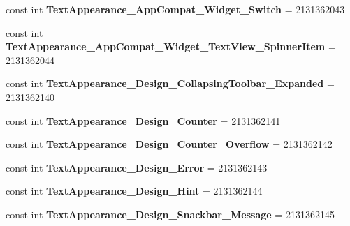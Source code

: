 \begin{DoxyCompactItemize}
const int {\bfseries Text\+Appearance\+\_\+\+App\+Compat\+\_\+\+Widget\+\_\+\+Switch} = 2131362043
\item 
\mbox{\label{class_sample_app_1_1_droid_1_1_resource_1_1_style_a3295f41aa6ce860e41ff571d0aaca1c1}} 
const int {\bfseries Text\+Appearance\+\_\+\+App\+Compat\+\_\+\+Widget\+\_\+\+Text\+View\+\_\+\+Spinner\+Item} = 2131362044
\item 
\mbox{\label{class_sample_app_1_1_droid_1_1_resource_1_1_style_ad457bffa7a45bf7fe483b547f41b3db3}} 
const int {\bfseries Text\+Appearance\+\_\+\+Design\+\_\+\+Collapsing\+Toolbar\+\_\+\+Expanded} = 2131362140
\item 
\mbox{\label{class_sample_app_1_1_droid_1_1_resource_1_1_style_a3cb410788e5c430deda63b88c0b3ae76}} 
const int {\bfseries Text\+Appearance\+\_\+\+Design\+\_\+\+Counter} = 2131362141
\item 
\mbox{\label{class_sample_app_1_1_droid_1_1_resource_1_1_style_ace82223f5f7abad9e2e5d111b4b6119a}} 
const int {\bfseries Text\+Appearance\+\_\+\+Design\+\_\+\+Counter\+\_\+\+Overflow} = 2131362142
\item 
\mbox{\label{class_sample_app_1_1_droid_1_1_resource_1_1_style_a49cf3b1806901eddf52fccea30f3f99e}} 
const int {\bfseries Text\+Appearance\+\_\+\+Design\+\_\+\+Error} = 2131362143
\item 
\mbox{\label{class_sample_app_1_1_droid_1_1_resource_1_1_style_ae1bbacdacd6513752ffdd1e026a3fa03}} 
const int {\bfseries Text\+Appearance\+\_\+\+Design\+\_\+\+Hint} = 2131362144
\item 
\mbox{\label{class_sample_app_1_1_droid_1_1_resource_1_1_style_a85c7c232a3240f3432a0cbe998bc738b}} 
const int {\bfseries Text\+Appearance\+\_\+\+Design\+\_\+\+Snackbar\+\_\+\+Message} = 2131362145
\item 
\mbox{\label{class_sample_app_1_1_droid_1_1_resource_1_1_style_a15c2ffcd2a3d0bed2fd8082f7b733fe3}} 

\end{DoxyCompactItemize}
